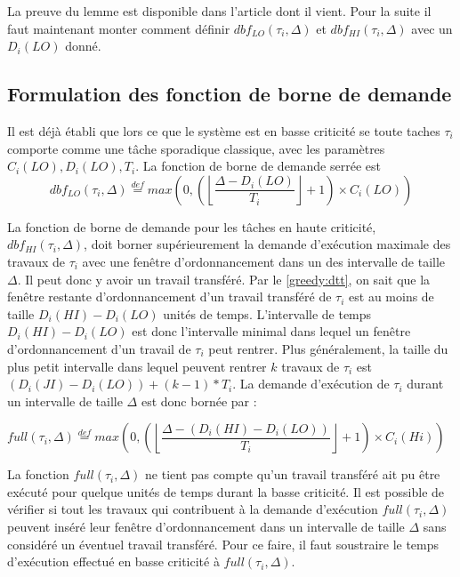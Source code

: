 \documentclass[12pt,a4paper,oneside]{book}
\theoremstyle{break}
\theoremstyle{breakplain}
\begin{document}
La preuve du lemme est disponible dans l'article dont il vient. Pour la suite il faut maintenant monter comment définir $dbf_{LO}(\tau_i, \Delta)$ et $dbf_{HI}(\tau_i, \Delta)$ avec un $D_i(LO)$ donné.

\subsection{Formulation des fonction de borne de demande}

Il est déjà établi que lors ce que le système est en basse criticité se toute taches $\tau_i$ comporte comme une tâche sporadique classique, avec les paramètres $C_i(LO), D_i(LO), T_i$. La fonction de borne de demande serrée est 
\begin{equation}
dbf_{LO}(\tau_i, \Delta) \overset{def}{=} max \left( 0, \left( \left\lfloor \dfrac{\Delta-D_i(LO)}{T_i} \right\rfloor +1 \right) \times C_i(LO) \right)
\end{equation}

La fonction de borne de demande pour les tâches en haute criticité, $dbf_{HI}(\tau_i, \Delta)$, doit borner supérieurement la demande d'exécution maximale des travaux de $\tau_i$ avec une fenêtre d'ordonnancement dans un des intervalle de taille $\Delta$. Il peut donc y avoir un travail transféré. Par le \autoref{greedy:dtt}, on sait que la fenêtre restante d'ordonnancement d'un travail transféré de $\tau_i$ est au moins de taille $D_i(HI) - D_i(LO)$ unités de temps. L'intervalle de temps $D_i(HI) - D_i(LO)$ est donc l'intervalle minimal dans lequel un fenêtre d'ordonnancement d'un travail de $\tau_i$ peut rentrer. Plus généralement, la taille du plus petit intervalle dans lequel peuvent rentrer $k$ travaux de $\tau_i$ est $(D_i(JI)-D_i(LO))+(k-1)*T_i$. La demande d'exécution de $\tau_i$ durant un intervalle de taille $\Delta$ est donc bornée par :
\begin{center}
$full(\tau_i, \Delta) \overset{def}{=} max \left(0,  \left( \left\lfloor \dfrac{\Delta - (D_i(HI) - D_i(LO))}{T_i}\right\rfloor +1 \right) \times C_i(Hi) \right)$
\end{center}

La fonction $full(\tau_i, \Delta)$ ne tient pas compte qu'un travail transféré ait pu être exécuté pour quelque unités de temps durant la basse criticité. Il est possible de vérifier si tout les travaux qui contribuent à la demande d'exécution $full(\tau_i, \Delta)$ peuvent inséré leur fenêtre d'ordonnancement dans un intervalle de taille $\Delta$ sans considéré un éventuel travail transféré. Pour ce faire, il faut soustraire le temps d'exécution effectué en basse criticité à $full(\tau_i, \Delta)$.\\
\end{document}
